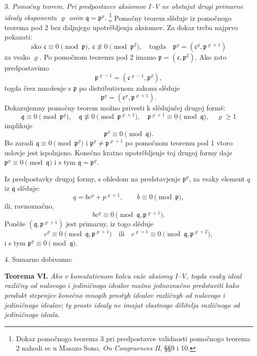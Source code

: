 \documentclass[11pt]{article}
\providecommand{\mc}{\mathfrak{c}}
\providecommand{\mq}{\mathfrak{q}}
\providecommand{\mpideal}{\mathfrak{p}}
\begin{document}
3. \emph{Pomočny teorem.} \emph{Pri predpostavce aksiomov I--V ne obstajut drugi primarne idealy eksponenta $\varrho$ osim $\mq=\mpideal^\varrho$.}
\footnote{Dokaz pomočnogo teorema 3 pri predpostavce validnosti pomočnogo teorema 2 nahodi se u Masazo Sono, \emph{On Congruences II}, §§9 i 10.}
Pomočny teorem slěduje iz pomočnogo teorema pod 2 bez daljnjego upotrěbljenja aksiomov. Za dokaz treba najprvo pokazati:
\[
        \text{ako }\mc\equiv0\pmod{\mpideal},\ \mc\not\equiv0\pmod{\mpideal^2},
        \quad\text{togda}\quad
        \mpideal^\varrho=(\mc^\varrho,\mpideal^{\varrho+1})
\]
za vsako $\varrho$. Po pomočnom teoremu pod 2 imamo $\mpideal=(\mc,\mpideal^2)$. Ako zato predpostavimo
\[
        \mpideal^{\varrho-1}=(\mc^{\varrho-1},\mpideal^\varrho),
\]
togda črez množenje s $\mpideal$ po distributivnom zakonu slěduje
\[
        \mpideal^\varrho=(\mc^\varrho,\mpideal^{\varrho+1}).
\]
Dokazujemny pomočny teorem možno privesti k slědujučej drugoj formě:
\[
        \mq\equiv0\pmod{\mpideal^\varrho},
        \quad \mq\not\equiv0\pmod{\mpideal^{\varrho+1}},
        \quad \mpideal^{\varrho+1}\equiv0\pmod{\mq},
        \quad \varrho\ge1
\]
implikuje
\[
        \mpideal^\varrho\equiv0\pmod{\mq}.
\]
Bo zaradi $\mq\equiv0\pmod{\mpideal^\varrho}$ i $\mpideal^\varrho\ne\mpideal^{\varrho+1}$ po pomočnom teoremu pod 1 vtoro uslovje jest ispolnjeno. Konečno kratno upotrěbljenje toj drugoj formy daje $\mpideal^\varrho\equiv0\pmod{\mq}$ i s tym $\mq=\mpideal^\varrho$.

Iz predpostavky drugoj formy, s ohledom na predstavjenje $\mpideal^\varrho$, za vsaky element $q$ iz $\mq$ slěduje:
\[
        q=b c^\varrho+p^{\varrho+1},
        \qquad b\equiv0\pmod{\mpideal},
\]
ili, ravnoznačno,
\[
        bc^\varrho\equiv0\pmod{\mq,\mpideal^{\varrho+1}}.
\]
Poněže $(\mq,\mpideal^{\varrho+1})$ jest primarny, iz togo slěduje
\[
        c^\varrho\equiv0\pmod{\mq,\mpideal^{\varrho+1}}
        \quad\text{ili}\quad
        c^{\varrho+1}\equiv0\pmod{\mq,\mpideal^{\varrho+2}},
\]
i s tym $\mpideal^\varrho\equiv0\pmod{\mq}$.

4. Sumarno dobivamo:

\textbf{Teorema VI.} \emph{Ako v komutativnom kolcu važe aksiomy I--V, togda vsaky ideal različny od nulovogo i jediničnogo idealov možno jednoznačno predstaviti kako produkt stepenjev konečno mnogih prostyh idealov različnyh od nulovogo i jediničnogo idealov; ty proste idealy ne imajut vlastnogo dělitelja različnogo od jediničnogo ideala.}
\end{document}
